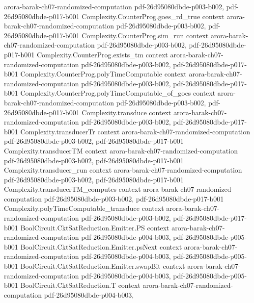 \begin{theorem}
  {arora-barak-ch07-randomized-computation}
  {pdf-26d95080dbde-p003-b002,
    pdf-26d95080dbde-p017-b001}
\proofstep
  {Complexity.CounterProg.goes_rd_true}
  {context}
  {arora-barak-ch07-randomized-computation}
  {pdf-26d95080dbde-p003-b002,
    pdf-26d95080dbde-p017-b001}
\proofstep
  {Complexity.CounterProg.sim_run}
  {context}
  {arora-barak-ch07-randomized-computation}
  {pdf-26d95080dbde-p003-b002,
    pdf-26d95080dbde-p017-b001}
\proofstep
  {Complexity.CounterProg.exists_tm}
  {context}
  {arora-barak-ch07-randomized-computation}
  {pdf-26d95080dbde-p003-b002,
    pdf-26d95080dbde-p017-b001}
\proofstep
  {Complexity.CounterProg.polyTimeComputable}
  {context}
  {arora-barak-ch07-randomized-computation}
  {pdf-26d95080dbde-p003-b002,
    pdf-26d95080dbde-p017-b001}
\proofstep
  {Complexity.CounterProg.polyTimeComputable_of_goes}
  {context}
  {arora-barak-ch07-randomized-computation}
  {pdf-26d95080dbde-p003-b002,
    pdf-26d95080dbde-p017-b001}
\proofstep
  {Complexity.transduce}
  {context}
  {arora-barak-ch07-randomized-computation}
  {pdf-26d95080dbde-p003-b002,
    pdf-26d95080dbde-p017-b001}
\proofstep
  {Complexity.transducerTr}
  {context}
  {arora-barak-ch07-randomized-computation}
  {pdf-26d95080dbde-p003-b002,
    pdf-26d95080dbde-p017-b001}
\proofstep
  {Complexity.transducerTM}
  {context}
  {arora-barak-ch07-randomized-computation}
  {pdf-26d95080dbde-p003-b002,
    pdf-26d95080dbde-p017-b001}
\proofstep
  {Complexity.transducer_run}
  {context}
  {arora-barak-ch07-randomized-computation}
  {pdf-26d95080dbde-p003-b002,
    pdf-26d95080dbde-p017-b001}
\proofstep
  {Complexity.transducerTM_computes}
  {context}
  {arora-barak-ch07-randomized-computation}
  {pdf-26d95080dbde-p003-b002,
    pdf-26d95080dbde-p017-b001}
\proofstep
  {Complexity.polyTimeComputable_transduce}
  {context}
  {arora-barak-ch07-randomized-computation}
  {pdf-26d95080dbde-p003-b002,
    pdf-26d95080dbde-p017-b001}
\proofstep
  {BoolCircuit.CktSatReduction.Emitter.PS}
  {context}
  {arora-barak-ch07-randomized-computation}
  {pdf-26d95080dbde-p004-b003,
    pdf-26d95080dbde-p005-b001}
\proofstep
  {BoolCircuit.CktSatReduction.Emitter.psNext}
  {context}
  {arora-barak-ch07-randomized-computation}
  {pdf-26d95080dbde-p004-b003,
    pdf-26d95080dbde-p005-b001}
\proofstep
  {BoolCircuit.CktSatReduction.Emitter.swapBit}
  {context}
  {arora-barak-ch07-randomized-computation}
  {pdf-26d95080dbde-p004-b003,
    pdf-26d95080dbde-p005-b001}
\proofstep
  {BoolCircuit.CktSatReduction.T}
  {context}
  {arora-barak-ch07-randomized-computation}
  {pdf-26d95080dbde-p004-b003,
}
\end{theorem}
